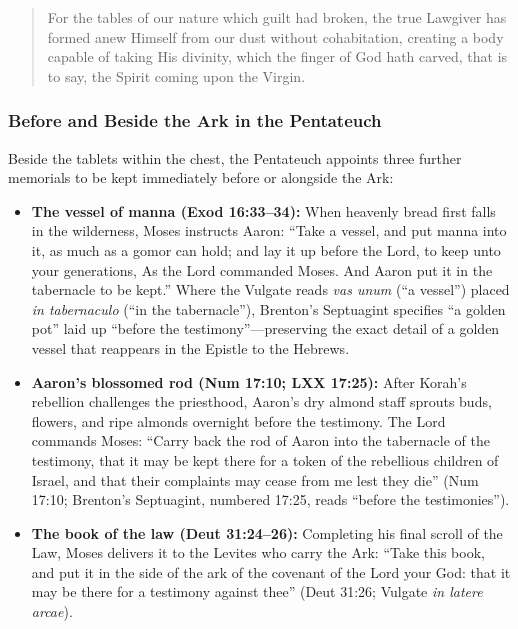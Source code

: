 \begin{quote}\small
For the tables of our nature which guilt had broken, the true Lawgiver has formed anew Himself from our dust without cohabitation, creating a body capable of taking His divinity, which the finger of God hath carved, that is to say, the Spirit coming upon the Virgin.
\end{quote}

\subsubsection{Before and Beside the Ark in the Pentateuch}

Beside the tablets within the chest, the Pentateuch appoints three further memorials to be kept immediately before or alongside the Ark:

\begin{itemize}
  \item \textbf{The vessel of manna (Exod 16:33--34):} When heavenly bread first falls in the wilderness, Moses instructs Aaron: ``Take a vessel, and put manna into it, as much as a gomor can hold; and lay it up before the Lord, to keep unto your generations, As the Lord commanded Moses. And Aaron put it in the tabernacle to be kept.'' Where the Vulgate reads \textit{vas unum} (``a vessel'') placed \textit{in tabernaculo} (``in the tabernacle''), Brenton's Septuagint specifies ``a golden pot'' laid up ``before the testimony''---preserving the exact detail of a golden vessel that reappears in the Epistle to the Hebrews.
  \item \textbf{Aaron's blossomed rod (Num 17:10; LXX 17:25):} After Korah's rebellion challenges the priesthood, Aaron's dry almond staff sprouts buds, flowers, and ripe almonds overnight before the testimony. The Lord commands Moses: ``Carry back the rod of Aaron into the tabernacle of the testimony, that it may be kept there for a token of the rebellious children of Israel, and that their complaints may cease from me lest they die'' (Num 17:10; Brenton's Septuagint, numbered 17:25, reads ``before the testimonies'').
  \item \textbf{The book of the law (Deut 31:24--26):} Completing his final scroll of the Law, Moses delivers it to the Levites who carry the Ark: ``Take this book, and put it in the side of the ark of the covenant of the Lord your God: that it may be there for a testimony against thee'' (Deut 31:26; Vulgate \textit{in latere arcae}).
\end{itemize}

